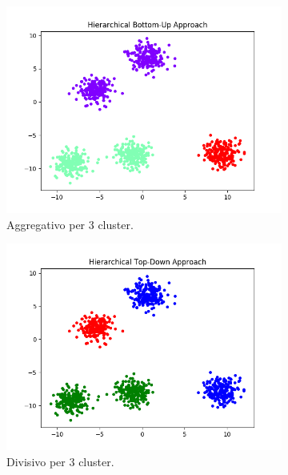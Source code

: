 \documentclass{llncs}
\begin{document}
	\begin{figure}[h]
		\begin{subfigure}{.5\textwidth}
		  \centering
		  \includegraphics[width=\linewidth]{immagini/5_clusters_3_agg.png}
		  \caption{Aggregativo per 3 cluster.}
		  \label{hier:a}
		\end{subfigure}%
		\begin{subfigure}{.5\textwidth}
		  \centering
		  \includegraphics[width=\linewidth]{immagini/5_clusters_3_div.png}
		  \caption{Divisivo per 3 cluster.}
		  \label{hier:b}
		\end{subfigure}
		\begin{subfigure}{.5\textwidth}
			\centering

\end{subfigure}
\end{figure}
\end{document}
